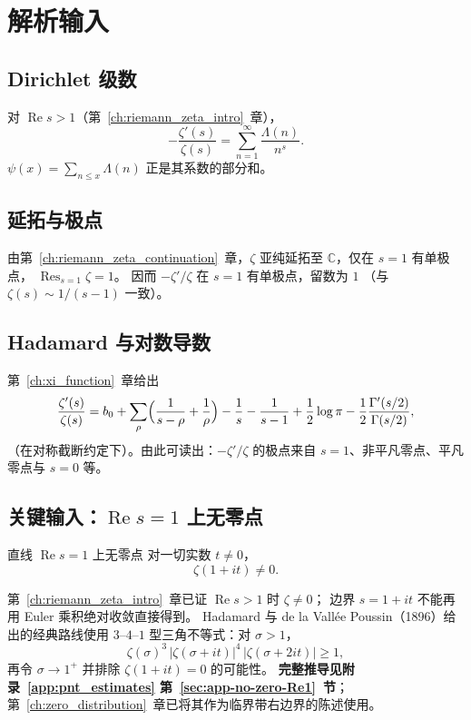 \section{解析输入}\label{sec:pnt_inputs}

\subsection{Dirichlet 级数}
对 $\operatorname{Re}s>1$（第~\ref{ch:riemann_zeta_intro}~章），
\begin{equation}
  -\frac{\zeta'(s)}{\zeta(s)}
  =\sum_{n=1}^{\infty}\frac{\Lambda(n)}{n^{s}}.
  \label{eq:pnt-logderiv}
\end{equation}
$\psi(x)=\sum_{n\le x}\Lambda(n)$ 正是其系数的部分和。

\subsection{延拓与极点}
由第~\ref{ch:riemann_zeta_continuation}~章，$\zeta$ 亚纯延拓至 $\mathbb{C}$，仅在 $s=1$ 有单极点，
$\operatorname{Res}_{s=1}\zeta=1$。
因而 $-\zeta'/\zeta$ 在 $s=1$ 有单极点，留数为 $1$
（与 $\zeta(s)\sim 1/(s-1)$ 一致）。

\subsection{Hadamard 与对数导数}
第~\ref{ch:xi_function}~章给出
\begin{equation}
  \frac{\zeta'(s)}{\zeta(s)}
  =b_0+\sum_{\rho}\Bigl(\frac{1}{s-\rho}+\frac{1}{\rho}\Bigr)
  -\frac{1}{s}-\frac{1}{s-1}
  +\frac12\log\pi
  -\frac12\frac{\Gamma'(s/2)}{\Gamma(s/2)},
  \label{eq:pnt-zeta-from-xi}
\end{equation}
（在对称截断约定下）。由此可读出：$-\zeta'/\zeta$ 的极点来自 $s=1$、非平凡零点、平凡零点与 $s=0$ 等。

\subsection{关键输入：\texorpdfstring{$\operatorname{Re}s=1$}{Re s=1} 上无零点}
\begin{theorem}{直线 $\operatorname{Re}s=1$ 上无零点}{}
\label{thm:no-zero-on-one}
对一切实数 $t\neq 0$，
\[
  \zeta(1+it)\neq 0.
\]
\end{theorem}

第~\ref{ch:riemann_zeta_intro}~章已证 $\operatorname{Re}s>1$ 时 $\zeta\neq 0$；
边界 $s=1+it$ 不能再用 Euler 乘积绝对收敛直接得到。
Hadamard 与 de la Vallée Poussin（1896）给出的经典路线使用
$3$--$4$--$1$ 型三角不等式：对 $\sigma>1$，
\begin{equation}
  \zeta(\sigma)^{3}\,
  \bigl|\zeta(\sigma+it)\bigr|^{4}\,
  \bigl|\zeta(\sigma+2it)\bigr|
  \ge 1,
  \label{eq:pnt-341}
\end{equation}
再令 $\sigma\to 1^+$ 并排除 $\zeta(1+it)=0$ 的可能性。
\textbf{完整推导见附录~\ref{app:pnt_estimates} 第~\ref{sec:app-no-zero-Re1}~节}；
第~\ref{ch:zero_distribution}~章已将其作为临界带右边界的陈述使用。

